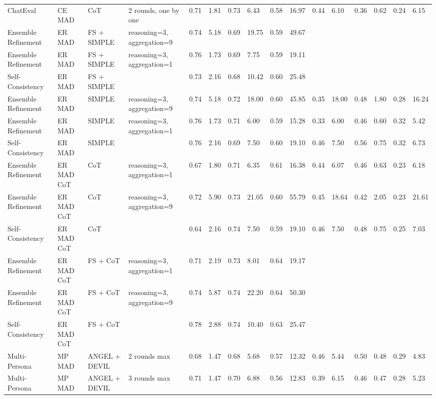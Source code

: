 \begin{landscape}
\begin{longtable}{p{2cm}p{1.5cm}p{1cm}p{2.5cm}llllllllllll}
ChatEval & CE MAD & CoT & 2 rounds, one by one & 0.71 & 1.81 & 0.73 & 6.43 & 0.58 & 16.97 & 0.44 & 6.10 & 0.36 & 0.62 & 0.24 & 6.15 \\
Ensemble Refinement & ER MAD & FS + SIMPLE & reasoning=3, aggregation=9 & 0.74 & 5.18 & 0.69 & 19.75 & 0.59 & 49.67 &  &  &  &  &  &  \\
Ensemble Refinement & ER MAD & FS + SIMPLE & reasoning=3, aggregation=1 & 0.76 & 1.73 & 0.69 & 7.75 & 0.59 & 19.11 &  &  &  &  &  &  \\
Self-Consistency & ER MAD & FS + SIMPLE &  & 0.73 & 2.16 & 0.68 & 10.42 & 0.60 & 25.48 &  &  &  &  &  &  \\
Ensemble Refinement & ER MAD & SIMPLE & reasoning=3, aggregation=9 & 0.74 & 5.18 & 0.72 & 18.00 & 0.60 & 45.85 & 0.35 & 18.00 & 0.48 & 1.80 & 0.28 & 16.24 \\
Ensemble Refinement & ER MAD & SIMPLE & reasoning=3, aggregation=1 & 0.76 & 1.73 & 0.71 & 6.00 & 0.59 & 15.28 & 0.33 & 6.00 & 0.46 & 0.60 & 0.32 & 5.42 \\
Self-Consistency & ER MAD & SIMPLE &  & 0.76 & 2.16 & 0.69 & 7.50 & 0.60 & 19.10 & 0.46 & 7.50 & 0.56 & 0.75 & 0.32 & 6.73 \\
Ensemble Refinement & ER MAD CoT & CoT & reasoning=3, aggregation=1 & 0.67 & 1.80 & 0.71 & 6.35 & 0.61 & 16.38 & 0.44 & 6.07 & 0.46 & 0.63 & 0.23 & 6.18 \\
Ensemble Refinement & ER MAD CoT & CoT & reasoning=3, aggregation=9 & 0.72 & 5.90 & 0.73 & 21.05 & 0.60 & 55.79 & 0.45 & 18.64 & 0.42 & 2.05 & 0.23 & 21.61 \\
Self-Consistency & ER MAD CoT & CoT &  & 0.64 & 2.16 & 0.74 & 7.50 & 0.59 & 19.10 & 0.46 & 7.50 & 0.48 & 0.75 & 0.25 & 7.03 \\
Ensemble Refinement & ER MAD CoT & FS + CoT & reasoning=3, aggregation=1 & 0.71 & 2.19 & 0.73 & 8.01 & 0.64 & 19.17 &  &  &  &  &  &  \\
Ensemble Refinement & ER MAD CoT & FS + CoT & reasoning=3, aggregation=9 & 0.74 & 5.87 & 0.74 & 22.20 & 0.64 & 50.30 &  &  &  &  &  &  \\
Self-Consistency & ER MAD CoT & FS + CoT &  & 0.78 & 2.88 & 0.74 & 10.40 & 0.63 & 25.47 &  &  &  &  &  &  \\
Multi-Persona & MP MAD & ANGEL + DEVIL & 2 rounds max & 0.68 & 1.47 & 0.68 & 5.68 & 0.57 & 12.32 & 0.46 & 5.44 & 0.50 & 0.48 & 0.29 & 4.83 \\
Multi-Persona & MP MAD & ANGEL + DEVIL & 3 rounds max & 0.71 & 1.47 & 0.70 & 6.88 & 0.56 & 12.83 & 0.39 & 6.15 & 0.46 & 0.47 & 0.28 & 5.23 \\

\end{longtable}
\end{landscape}
